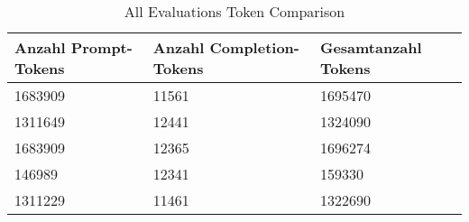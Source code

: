 
    \begin{table}[!ht]
        \centering
        \begin{tabularx}{\textwidth}{l l l}
\toprule
\textbf{Anzahl Prompt-Tokens} & \textbf{Anzahl Completion-Tokens} & \textbf{Gesamtanzahl Tokens} \\
\midrule
\num{1683909} & \num{11561} & \num{1695470} \\
\num{1311649} & \num{12441} & \num{1324090} \\
\num{1683909} & \num{12365} & \num{1696274} \\
\num{146989} & \num{12341} & \num{159330} \\
\num{1311229} & \num{11461} & \num{1322690} \\
\bottomrule
\end{tabularx}

        \caption{All Evaluations Token Comparison}
        \label{tab:all-evaluations-token-comparison}
    \end{table}
    